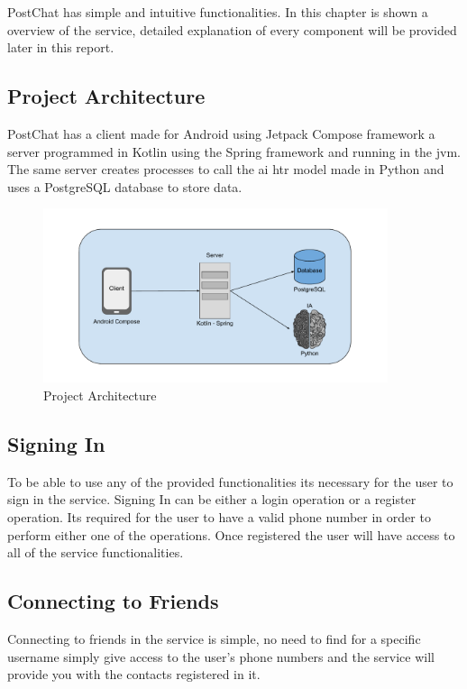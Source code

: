 PostChat has simple and intuitive functionalities. In this chapter is shown a overview of the service, detailed explanation of every component will be provided later in this report.

\subsection{Project Architecture}
PostChat has a client made for Android using Jetpack Compose framework a server programmed in Kotlin using the Spring framework and running in the \gls{jvm}. The same server creates processes to call the \gls{ai} \gls{htr} model made in Python and uses a PostgreSQL database to store data. 

\begin{figure}[!ht]
	\centering
	\includegraphics[width=0.9\textwidth]{./Chapter3/Figures/Project Structure}
	\caption{Project Architecture}
	\label{fig:PStruct}
\end{figure}


\subsection{Signing In}
To be able to use any of the provided functionalities its necessary for the user to sign in the service. Signing In can be either a login operation or a register operation. Its required for the user to have a valid phone number in order to perform either one of the operations.
Once registered the user will have access to all of the service functionalities.

\subsection{Connecting to Friends}
Connecting to friends in the service is simple, no need to find for a specific username simply give access to the user's phone numbers and the service will provide you with the contacts registered in it.   

